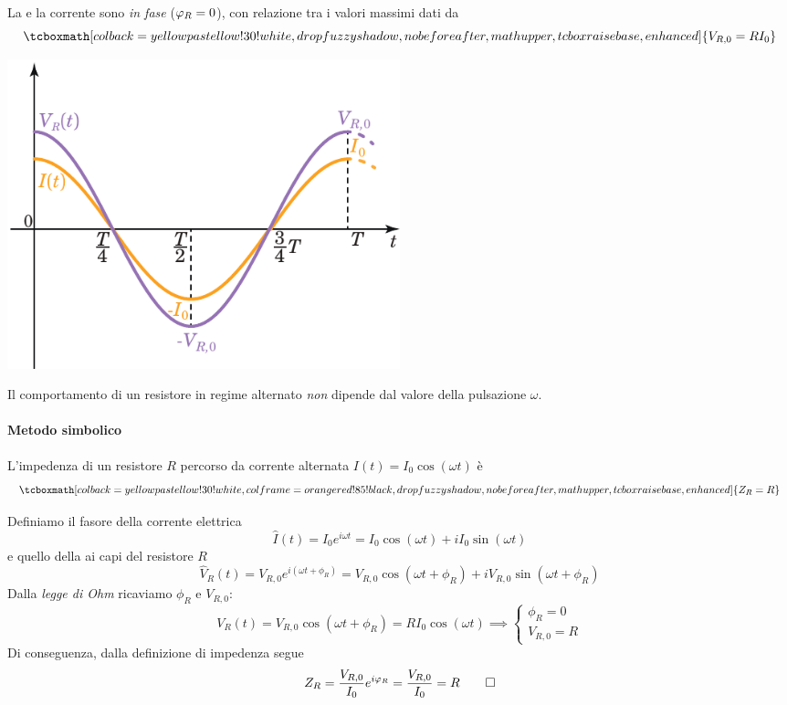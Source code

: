 La \ddp e la corrente sono \textit{in fase} ($\oldphi_R=0$), con relazione tra i valori massimi dati da
\begin{equation}
	\tcboxmath[colback=yellowpastellow!30!white,drop fuzzy shadow, nobeforeafter, math upper, tcbox raise base, enhanced]{V_{R,0}=RI_0}
\end{equation}
\begin{center}
	\includegraphics[width=0.5\textwidth]{images/chp11/chp11Rsymbgraf2.pdf}
\end{center}
\begin{observe}
	Il comportamento di un resistore in regime alternato \textit{non} dipende dal valore della pulsazione $\omega$.
\end{observe}
\paragraph{Metodo simbolico}
\begin{proposition}
	L'impedenza di un resistore $R$ percorso da corrente alternata $I(t)=I_0\cos(\omega t)$ è
	\begin{equation}
		\tcboxmath[colback=yellowpastellow!30!white,colframe=orangered!85!black,drop fuzzy shadow, nobeforeafter, math upper, tcbox raise base, enhanced]{Z_R=R}
	\end{equation}
\end{proposition}
\begin{demonstrationopt}
	Definiamo il fasore della corrente elettrica
	\begin{equation*}
		\hat{I}(t)=I_0e^{i\omega t}=I_0\cos(\omega t)+iI_0\sin(\omega t)
	\end{equation*}
	e quello della \ddp ai capi del resistore $R$
	\begin{equation*}
		\hat{V}_R(t)=V_{R,0}e^{i(\omega t+\phi_R)}=V_{R,0}\cos(\omega t+\phi_R)+iV_{R,0}\sin(\omega t+\phi_R)
	\end{equation*}
	Dalla \textit{legge di Ohm} ricaviamo $\phi_R$ e $V_{R,0}$:
	\begin{equation*}
		V_R(t)=V_{R,0}\cos(\omega t+\phi_R)=RI_0\cos(\omega t)\implies \begin{cases}
			\phi_R=0\\
			V_{R,0}=R
		\end{cases} 
	\end{equation*}
	Di conseguenza, dalla definizione di impedenza segue
	\begin{equation*}
		Z_R=\frac{V_{R,0}}{I_0}e^{i\oldphi_R}=\frac{V_{R,0}}{I_0}=R\qedhere
	\end{equation*}
\end{demonstrationopt}
